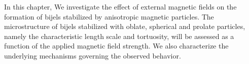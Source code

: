In this chapter, We investigate the effect of external magnetic fields on the formation of bijels stabilized by 
anisotropic magnetic particles. The microstructure of bijels stabilized with oblate, spherical and prolate particles, 
namely the characteristic length scale and tortuosity, will be assessed as a function of the applied magnetic field
strength. We also characterize the underlying mechanisms governing the observed behavior. 


